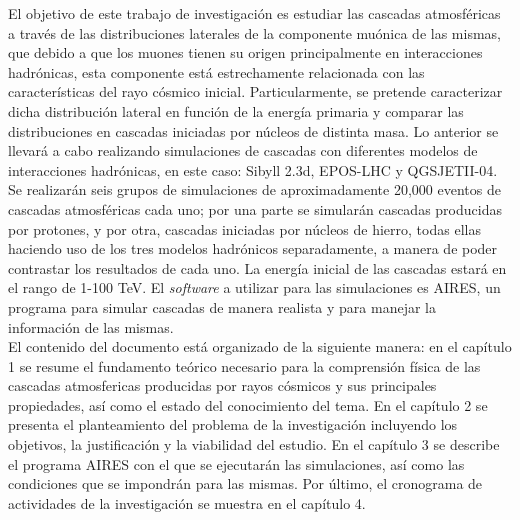 El objetivo de este trabajo de investigaci\'on es estudiar las cascadas atmosf\'ericas a trav\'es de las distribuciones laterales de la componente mu\'onica de las mismas, que debido a que los muones tienen su origen principalmente en interacciones hadr\'onicas, esta componente est\'a estrechamente relacionada con las caracter\'isticas del rayo c\'osmico inicial. Particularmente, se pretende caracterizar dicha distribuci\'on lateral en funci\'on de la energ\'ia primaria y comparar las distribuciones en cascadas iniciadas por n\'ucleos de distinta masa. Lo anterior se llevar\'a a cabo realizando simulaciones de cascadas con diferentes modelos de interacciones hadrónicas, en este caso: Sibyll 2.3d, EPOS-LHC y QGSJETII-04.\\

Se realizar\'an seis grupos de simulaciones de aproximadamente 20,000 eventos de cascadas atmosf\'ericas cada uno; por una parte se simular\'an cascadas producidas por protones, y por otra, cascadas iniciadas por n\'ucleos de hierro, todas ellas haciendo uso de los tres modelos hadr\'onicos separadamente, a manera de poder contrastar los resultados de cada uno. La energ\'ia inicial de las cascadas estar\'a en el rango de 1-100 TeV. El \textit{software} a utilizar para las simulaciones es AIRES, un programa para simular cascadas de manera realista y para manejar la informaci\'on de las mismas. \\

El contenido del documento est\'a organizado de la siguiente manera: en el capítulo 1 se resume el fundamento teórico necesario para la comprensión física de las cascadas atmosfericas producidas por rayos cósmicos y sus principales propiedades, así como el estado del conocimiento del tema. En el capítulo 2 se presenta el planteamiento del problema de la investigación incluyendo los objetivos, la justificación y la viabilidad del estudio. En el capítulo 3 se describe el programa AIRES con el que se ejecutar\'an las simulaciones, así como las condiciones que se impondr\'an para las mismas. Por último, el cronograma de actividades de la investigación se muestra en el capítulo 4.




\singlespace